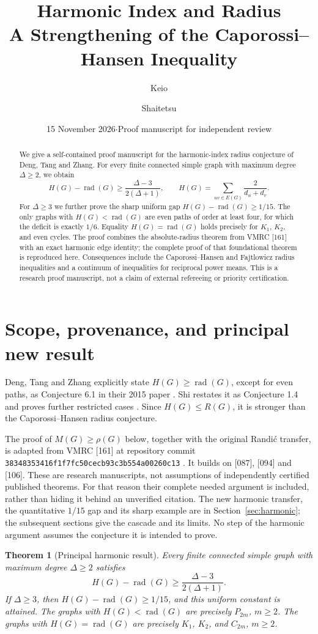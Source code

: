 \documentclass[11pt,a4paper]{article}
\title{Harmonic Index and Radius\\A Strengthening of the Caporossi--Hansen Inequality}
\author{Keio \and Shaitetsu}
\date{15 November 2026\quad$\cdot$\quad Proof manuscript for independent review}
\newtheorem{theorem}{Theorem}[section]
\newcommand{\rad}{\operatorname{rad}}
\begin{document}
\maketitle
\begin{abstract}
We give a self-contained proof manuscript for the harmonic-index radius
conjecture of Deng, Tang and Zhang. For every finite connected simple
graph with maximum degree $\Delta\ge2$, we obtain
\[
H(G)-\rad(G)\ge\frac{\Delta-3}{2(\Delta+1)},\qquad
H(G)=\sum_{uv\in E(G)}\frac{2}{d_u+d_v}.
\]
For $\Delta\ge3$ we further prove the sharp uniform gap
$H(G)-\rad(G)\ge1/15$. The only graphs with $H(G)<\rad(G)$
are even paths of order at least four, for which the deficit is exactly
$1/6$. Equality $H(G)=\rad(G)$ holds precisely for $K_1$, $K_2$,
and even cycles. The proof combines the absolute-radius theorem from
VMRC [161] with an exact harmonic edge identity; the complete proof of
that foundational theorem is reproduced here. Consequences include
the Caporossi--Hansen and Fajtlowicz radius inequalities and a continuum
of inequalities for reciprocal power means. This is a research proof
manuscript, not a claim of external refereeing or priority certification.
\end{abstract}


\section{Scope, provenance, and principal new result}
Deng, Tang and Zhang explicitly state $H(G)\ge\rad(G)$, except for
even paths, as Conjecture 6.1 in their 2015 paper \cite{Deng}.
Shi restates it as Conjecture 1.4 and proves further restricted cases
\cite{Shi}. Since $H(G)\le R(G)$, it is stronger than the
Caporossi--Hansen radius conjecture.

The proof of $M(G)\ge\rho(G)$ below, together with the original
Randi\'c transfer, is adapted from VMRC [161] at repository commit
\texttt{38348353416f1f7fc50cecb93c3b554a00260c13} \cite{VMRC161}.
It builds on [087], [094] and [106]. These are research manuscripts,
not assumptions of independently certified published theorems.
For that reason their complete needed argument is included, rather
than hiding it behind an unverified citation. The new harmonic transfer,
the quantitative $1/15$ gap and its sharp example are in
Section~\ref{sec:harmonic}; the subsequent sections give the cascade
and its limits. No step of the harmonic argument assumes the
conjecture it is intended to prove.

\begin{theorem}[Principal harmonic result]\label{thm:harmonic-main}
Every finite connected simple graph with maximum degree $\Delta\ge2$
satisfies
\[
H(G)-\rad(G)\ge\frac{\Delta-3}{2(\Delta+1)}.
\]
If $\Delta\ge3$, then $H(G)-\rad(G)\ge1/15$, and this uniform
constant is attained. The graphs with $H(G)<\rad(G)$ are precisely
$P_{2m}$, $m\ge2$. The graphs with $H(G)=\rad(G)$ are precisely
$K_1$, $K_2$, and $C_{2m}$, $m\ge2$.
\end{theorem}
\end{document}
